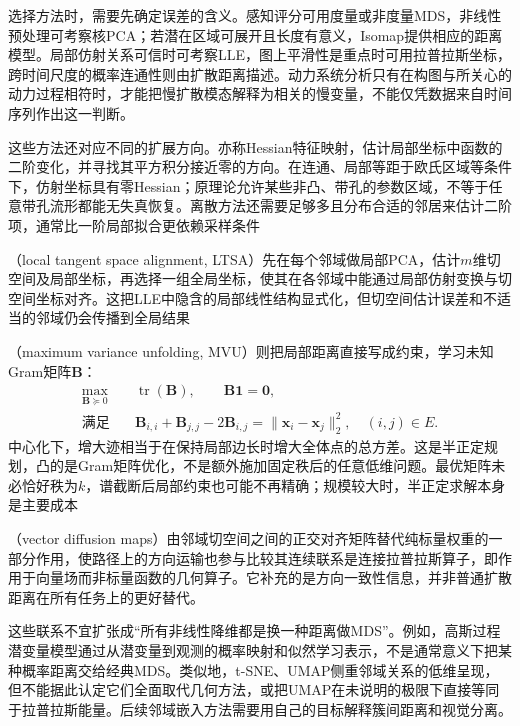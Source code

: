 选择方法时，需要先确定误差的含义。感知评分可用度量或非度量MDS，非线性预处理可考察核PCA；若潜在区域可展开且长度有意义，Isomap提供相应的距离模型。局部仿射关系可信时可考察LLE，图上平滑性是重点时可用拉普拉斯坐标，跨时间尺度的概率连通性则由扩散距离描述。动力系统分析只有在构图与所关心的动力过程相符时，才能把慢扩散模态解释为相关的慢变量，不能仅凭数据来自时间序列作出这一判断。

这些方法还对应不同的扩展方向。亦称Hessian特征映射，估计局部坐标中函数的二阶变化，并寻找其平方积分接近零的方向。在连通、局部等距于欧氏区域等条件下，仿射坐标具有零Hessian；原理论允许某些非凸、带孔的参数区域，不等于任意带孔流形都能无失真恢复。离散方法还需要足够多且分布合适的邻居来估计二阶项，通常比一阶局部拟合更依赖采样条件

（local tangent space alignment, LTSA）先在每个邻域做局部PCA，估计$m$维切空间及局部坐标，再选择一组全局坐标，使其在各邻域中能通过局部仿射变换与切空间坐标对齐。这把LLE中隐含的局部线性结构显式化，但切空间估计误差和不适当的邻域仍会传播到全局结果

（maximum variance unfolding, MVU）则把局部距离直接写成约束，学习未知Gram矩阵$\bm{B}$：
\[
  \begin{aligned}
    \max_{\bm{B}\succeq0}\quad&
      \operatorname{tr}(\bm{B}),\qquad \bm{B}\bm{1}=\bm{0},\\
    \text{满足}\quad&
      \bm{B}_{i,i}+\bm{B}_{j,j}-2\bm{B}_{i,j}
      =\lVert\bm{x}_i-\bm{x}_j\rVert_2^2,\quad(i,j)\in E.
  \end{aligned}
\]
中心化下，增大迹相当于在保持局部边长时增大全体点的总方差。这是半正定规划，凸的是Gram矩阵优化，不是额外施加固定秩后的任意低维问题。最优矩阵未必恰好秩为$k$，谱截断后局部约束也可能不再精确；规模较大时，半正定求解本身是主要成本

（vector diffusion maps）由邻域切空间之间的正交对齐矩阵替代纯标量权重的一部分作用，使路径上的方向运输也参与比较其连续联系是连接拉普拉斯算子，即作用于向量场而非标量函数的几何算子。它补充的是方向一致性信息，并非普通扩散距离在所有任务上的更好替代。

这些联系不宜扩张成“所有非线性降维都是换一种距离做MDS”。例如，高斯过程潜变量模型通过从潜变量到观测的概率映射和似然学习表示，不是通常意义下把某种概率距离交给经典MDS。类似地，t-SNE、UMAP侧重邻域关系的低维呈现，但不能据此认定它们全面取代几何方法，或把UMAP在未说明的极限下直接等同于拉普拉斯能量。后续邻域嵌入方法需要用自己的目标解释簇间距离和视觉分离。

